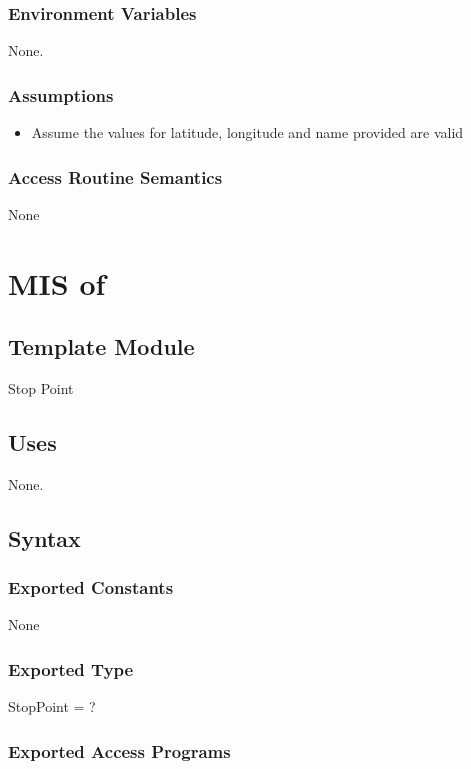 \documentclass[12pt, titlepage]{article}
\begin{document}
\subsubsection{Environment Variables}
None.
\subsubsection{Assumptions}
\begin{itemize}
    \item Assume the values for latitude, longitude and name provided are valid
\end{itemize}

\subsubsection{Access Routine Semantics}
None
\color{black}

\newpage
\color{red}
\section{MIS of } \label{Module} 

\subsection{Template Module}
Stop Point

\subsection{Uses}
None.

\subsection{Syntax}

\subsubsection{Exported Constants}
None

\subsubsection{Exported Type}
StopPoint = ?

\subsubsection{Exported Access Programs}
\end{document}
